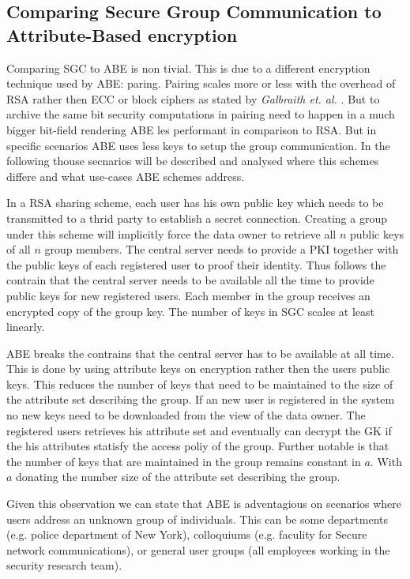 \subsection{Comparing Secure Group Communication to Attribute-Based encryption}
Comparing SGC to ABE is non tivial. This is due to a different encryption technique used by ABE: paring. Pairing scales more or less with the overhead of RSA rather then ECC or block ciphers as stated by \textit{Galbraith et. al.} \cite{galbraith2008pairings}. But to archive the same bit security computations in pairing need to happen in a much bigger bit-field rendering ABE les performant in comparison to RSA. But in specific scenarios ABE uses less keys to setup the group communication. In the following thouse secnarios will be described and analysed where this schemes differe and what use-cases ABE schemes address.

In a RSA sharing scheme, each user has his own public key which needs to be transmitted to a thrid party to establish a secret connection. Creating a group under this scheme will implicitly force the data owner to retrieve all $n$ public keys of all $n$ group members. The central server needs to provide a PKI together with the public keys of each registered user to proof their identity. Thus follows the contrain that the central server needs to be available all the time to provide public keys for new registered users. Each member in the group receives an encrypted copy of the group key. The number of keys in SGC scales at least linearly. 

ABE breaks the contrains that the central server has to be available at all time. This is done by using attribute keys on encryption rather then the users public keys. This reduces the number of keys that need to be maintained to the size of the attribute set describing the group. If an new user is registered in the system no new keys need to be downloaded from the view of the data owner. The registered users retrieves his attribute set and eventually can decrypt the GK if the his attributes statisfy the access poliy of the group. Further notable is that the number of keys that are maintained in the group remains constant in $a$. With $a$ donating the number size of the attribute set describing the group. 

Given this observation we can state that ABE is adventagious on scenarios where users address an unknown group of individuals. This can be some departments (e.g. police department of New York), colloquiums (e.g. faculity for Secure network communications), or general user groups (all employees working in the security research team).

